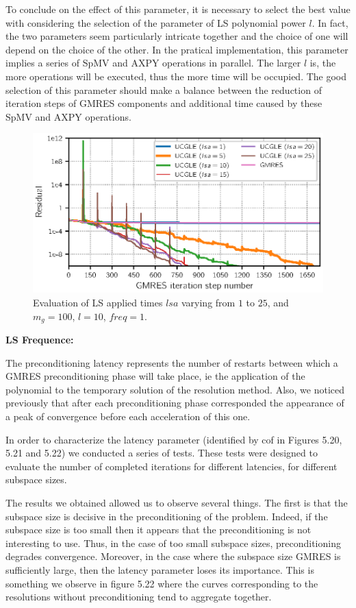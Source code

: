 To conclude on the effect of this parameter, it is necessary to select the best value with considering the selection of the parameter of LS polynomial power $l$. In fact, the two parameters seem particularly intricate together and the choice of one will depend on the choice of the other. In the pratical implementation, this parameter implies a series of SpMV and AXPY operations in parallel. The larger $l$ is, the more operations will be executed, thus the more time will be occupied. The good selection of this parameter should make a balance between the reduction of iteration steps of GMRES components and additional time caused by these SpMV and AXPY operations.

\begin{figure}[htbp]
	\centering
	\includegraphics[width=6.2in]{fig/conv_lsappied.eps}
	\caption{Evaluation of LS applied times $lsa$ varying from $1$ to $25$, and $m_g=100$, $l=10$, $freq=1$. }
	\label{fig:Lsappliedtime}
\end{figure}


\textbf{LS Frequence:}

The preconditioning latency represents the number of restarts between which a GMRES preconditioning phase will take place, ie the application of the polynomial to the temporary solution of the resolution method. Also, we noticed previously that after each preconditioning phase corresponded the appearance of a peak of convergence before each acceleration of this one.

In order to characterize the latency parameter (identified by cof in Figures 5.20, 5.21 and 5.22) we conducted a series of tests. These tests were designed to evaluate the number of completed iterations for different latencies, for different subspace sizes.

The results we obtained allowed us to observe several things. The first is that the subspace size is decisive in the preconditioning of the problem. Indeed, if the subspace size is too small then it appears that the preconditioning is not interesting to use. Thus, in the case of too small subspace sizes, preconditioning degrades convergence.  Moreover, in the case where the subspace size GMRES is sufficiently large, then the latency parameter loses its importance. This is something we observe in figure 5.22 where the curves corresponding to the resolutions without preconditioning tend to aggregate together.

